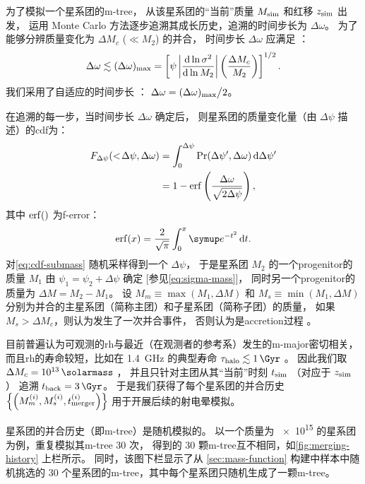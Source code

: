 为了模拟一个星系团的\ac{m-tree}，
从该星系团的\enquote{当前}质量 $M_{\mathrm{sim}}$ 和红移 $z_{\mathrm{sim}}$ 出发，
运用 Monte Carlo 方法逐步追溯其成长历史，追溯的时间步长为 $\Delta\omega$。
为了能够分辨质量变化为 $\Delta M_c$ ($\ll M_2$) 的并合，
时间步长 $\Delta\omega$ 应满足 \cite{lacey1993}：
\begin{equation}
  \Delta\omega \lesssim (\Delta\omega)_{\mathrm{max}} =
    \left[ \psi \left| \frac{\mathrm{d}\ln \sigma^2}{\mathrm{d}\ln M_2} \right|
      \left( \frac{\Delta M_c}{M_2} \right) \right]^{1/2} .
\end{equation}
我们采用了自适应的时间步长 \cite{randall2002}：
$\Delta\omega = (\Delta\omega)_{\mathrm{max}} \big/ 2$。

在追溯的每一步，当时间步长 $\Delta\omega$ 确定后，
则星系团的质量变化量（由 $\Delta\psi$ 描述）的\ac{cdf}为：
\begin{align}
  F_{\Delta\psi}(<\!\Delta\psi, \Delta\omega)
    & = \int_0^{\Delta\psi} \mathrm{Pr}(\Delta\psi', \Delta\omega)
      \,\mathrm{d}\Delta\psi' \\
    & = 1 - \operatorname{erf} \left( \frac{\Delta\omega}{\sqrt{2\Delta\psi}} \right) ,
  \label{eq:cdf-submass}
\end{align}
其中 $\operatorname{erf}()$ 为\ac{f-error}：
\begin{equation}
  \erf(x) = \frac{2}{\sqrt{\pi}} \int_0^x \Ce^{-t^2} \,\D{t} .
\end{equation}
对\autoref{eq:cdf-submass} 随机采样得到一个 $\Delta\psi$，
于是星系团 $M_2$ 的一个\ac{progenitor}的质量 $M_1$
由 $\psi_1 = \psi_2 + \Delta\psi$ 确定 [参见\autoref{eq:sigma-mass}]，
同时另一个\ac{progenitor}的质量为 $\Delta M = M_2 - M_1$。
设 $M_m \equiv \max(M_1, \Delta M)$ 和 $M_s \equiv \min(M_1, \Delta M)$
分别为并合的主星系团（简称主团）和子星系团（简称子团）的质量，
如果 $M_s > \Delta M_c$，则认为发生了一次并合事件，
否则认为是\ac{accretion}过程 \cite{randall2002}。

目前普遍认为可观测的\ac{rh}与最近（在观测者的参考系）发生的\ac{m-major}密切相关，
而且\ac{rh}的寿命较短，比如在 \SI{1.4}{\GHz} 的典型寿命
$\tau_{\R{halo}} \lesssim \SI{1}{\Gyr}$ \cite{brunetti2009,cassano2016}。
因此我们取 $\Delta M_c = \SI{e13}{\solarmass}$ \cite{cassano2005}，
并且只针对主团从其\enquote{当前}时刻 $t_{\mathrm{sim}}$ （对应于 $z_{\mathrm{sim}}$）
追溯 $t_{\R{back}} = \SI{3}{\Gyr}$。
于是我们获得了每个星系团的并合历史
$\left\{\left( M_m^{(i)}, M_s^{(i)}, t_{\mathrm{merger}}^{(i)} \right)\right\}$
用于开展后续的射电晕模拟。

星系团的并合历史（即\ac{m-tree}）是随机模拟的。
以一个质量为 \SI{e15}{\solarmass} 的星系团为例，重复模拟其\ac{m-tree} 30 次，
得到的 30 颗\ac{m-tree}互不相同，如\autoref{fig:merging-history} 上栏所示。
同时，该图下栏显示了从 \autoref{sec:mass-function} 构建中样本中随机挑选的
30 个星系团的\ac{m-tree}，其中每个星系团只随机生成了一颗\ac{m-tree}。

